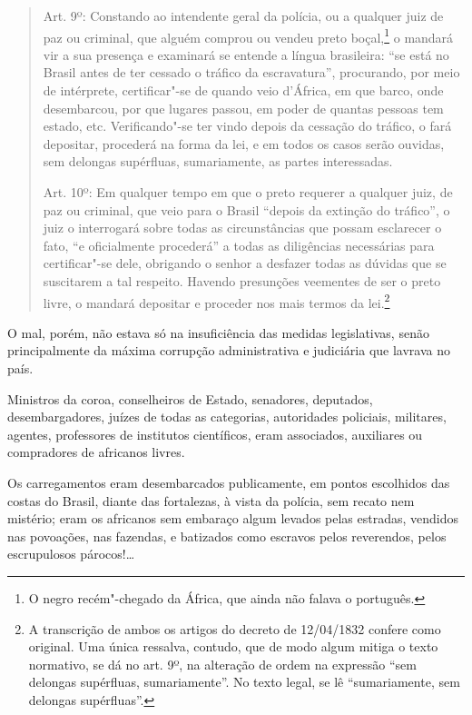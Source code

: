 \begin{quote}
Art. 9º: Constando ao intendente geral da polícia, ou a qualquer juiz
de paz ou criminal, que alguém comprou ou vendeu preto boçal,\footnote{
  O negro recém"-chegado da África, que ainda não falava o português.} o
mandará vir a sua presença e examinará se entende a língua brasileira:
``se está no Brasil antes de ter cessado o tráfico da escravatura'',
procurando, por meio de intérprete, certificar"-se de quando veio
d'África, em que barco, onde desembarcou, por que lugares passou, em
poder de quantas pessoas tem estado, etc. Verificando"-se ter vindo
depois da cessação do tráfico, o fará depositar, procederá na forma da
lei, e em todos os casos serão ouvidas, sem delongas supérfluas,
sumariamente, as partes interessadas.

Art. 10º: Em qualquer tempo em que o preto requerer a qualquer juiz, de
paz ou criminal, que veio para o Brasil ``depois da extinção do tráfico'',
o juiz o interrogará sobre todas as circunstâncias que possam esclarecer
o fato, ``e oficialmente procederá'' a todas as diligências necessárias
para certificar"-se dele, obrigando o senhor a desfazer todas as dúvidas
que se suscitarem a tal respeito. Havendo presunções veementes de ser o
preto livre, o mandará depositar e proceder nos mais termos da
lei.\footnote{A transcrição de ambos os artigos do decreto de
  12/04/1832 confere como original. Uma única ressalva, contudo, que de
  modo algum mitiga o texto normativo, se dá no art. 9º, na alteração
  de ordem na expressão ``sem delongas supérfluas, sumariamente''. No
  texto legal, se lê ``sumariamente, sem delongas
  supérfluas''.}
\end{quote}  

O mal, porém, não estava só na insuficiência das medidas legislativas,
senão principalmente da máxima corrupção administrativa e judiciária que
lavrava no país.

Ministros da coroa, conselheiros de Estado, senadores, deputados,
desembargadores, juízes de todas as categorias, autoridades policiais,
militares, agentes, professores de institutos científicos, eram
associados, auxiliares ou compradores de africanos livres.

Os carregamentos eram desembarcados publicamente, em pontos escolhidos
das costas do Brasil, diante das fortalezas, à vista da polícia, sem
recato nem mistério; eram os africanos sem embaraço algum levados pelas
estradas, vendidos nas povoações, nas fazendas, e batizados como
escravos pelos reverendos, pelos escrupulosos párocos!\ldots{}

